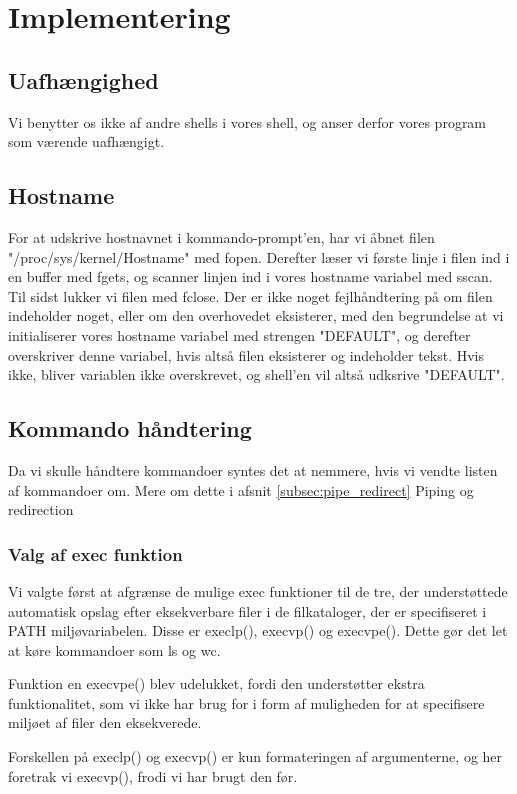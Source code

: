 \section{Implementering}
\subsection{Uafhængighed}


Vi benytter os ikke af andre shells i vores shell, og anser derfor vores program som værende uafhængigt. 

\subsection{Hostname}
For at udskrive hostnavnet i kommando-prompt'en, har vi åbnet filen "/proc/sys/kernel/Hostname" med fopen. Derefter læser vi første linje i filen ind i en buffer med fgets, og scanner linjen ind i vores hostname variabel med sscan. Til sidst lukker vi filen med fclose. Der er ikke noget fejlhåndtering på om filen indeholder noget, eller om den overhovedet eksisterer, med den begrundelse at vi initialiserer vores hostname variabel med strengen "DEFAULT", og derefter overskriver denne variabel, hvis altså filen eksisterer og indeholder tekst. Hvis ikke, bliver variablen ikke overskrevet, og shell'en vil altså udksrive "DEFAULT".

\subsection{Kommando håndtering}
Da vi skulle håndtere kommandoer syntes det at nemmere, hvis vi vendte listen af kommandoer om. Mere om dette i afsnit \ref{subsec:pipe_redirect} Piping og redirection

\subsubsection{Valg af exec funktion}
Vi valgte først at afgrænse de mulige exec funktioner til de tre, der understøttede automatisk opslag efter eksekverbare filer i de filkataloger, der er specifiseret i PATH miljøvariabelen. Disse er execlp(), execvp() og execvpe(). Dette gør det let at køre kommandoer som ls og wc.

Funktion en execvpe() blev udelukket, fordi den understøtter ekstra funktionalitet, som vi ikke har brug for i form af muligheden for at specifisere miljøet af filer den eksekverede.

Forskellen på execlp() og execvp() er kun formateringen af argumenterne, og her foretrak vi execvp(), frodi vi har brugt den før.
